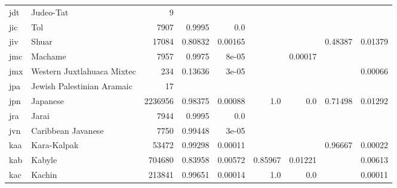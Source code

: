 \documentclass[11pt]{article}
\begin{document}
\begin{table*}[h]
{\begin{tabular}{llrrrrrrr}
jdt         & Judeo-Tat         & 9         &          &          &          &          &          &          \\

jic         & Tol         & 7907         & 0.9995         & 0.0         &          &          &          &          \\

jiv         & Shuar         & 17084         & 0.80832         & 0.00165         &          &          & 0.48387         & 0.01379         \\

jmc         & Machame         & 7957         & 0.9975         & 8e-05         &          & 0.00017         &          &          \\

jmx         & Western Juxtlahuaca Mixtec         & 234         & 0.13636         & 3e-05         &          &          &          & 0.00066         \\

jpa         & Jewish Palestinian Aramaic         & 17         &          &          &          &          &          &          \\

jpn         & Japanese         & 2236956         & 0.98375         & 0.00088         & 1.0         & 0.0         & 0.71498         & 0.01292         \\

jra         & Jarai         & 7944         & 0.9995         & 0.0         &          &          &          &          \\

jvn         & Caribbean Javanese         & 7750         & 0.99448         & 3e-05         &          &          &          &          \\

kaa         & Kara-Kalpak         & 53472         & 0.99298         & 0.00011         &          &          & 0.96667         & 0.00022         \\

kab         & Kabyle         & 704680         & 0.83958         & 0.00572         & 0.85967         & 0.01221         &          & 0.00613         \\

kac         & Kachin         & 213841         & 0.99651         & 0.00014         & 1.0         & 0.0         &          & 0.00011         \\


\end{tabular}}
\end{table*}
\end{document}
